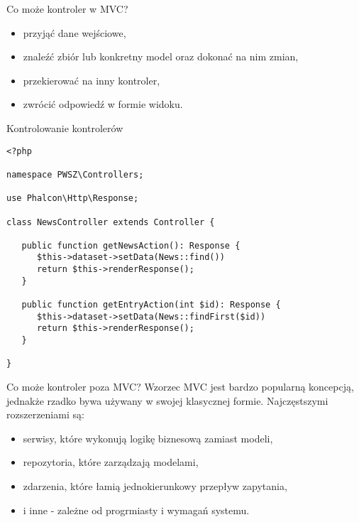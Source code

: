 \begin{frame}{Co może kontroler w MVC?}
	\begin{itemize}
		\item przyjąć dane wejściowe,
		\item znaleźć zbiór lub konkretny model oraz dokonać na nim zmian,
		\item przekierować na inny kontroler,
		\item zwrócić odpowiedź w formie widoku.
	\end{itemize}
\end{frame}

\begin{frame}[fragile]{Kontrolowanie kontrolerów}
	\begin{lstlisting}
<?php

namespace PWSZ\Controllers;

use Phalcon\Http\Response;

class NewsController extends Controller {

   public function getNewsAction(): Response {
      $this->dataset->setData(News::find())
      return $this->renderResponse();
   }

   public function getEntryAction(int $id): Response {
      $this->dataset->setData(News::findFirst($id))
      return $this->renderResponse();
   }

}
	\end{lstlisting}
\end{frame}

\begin{frame}{Co może kontroler poza MVC?}
	Wzorzec MVC jest bardzo popularną koncepcją, jednakże rzadko bywa używany w swojej klasycznej formie. Najczęstszymi rozszerzeniami są:
	\begin{itemize}
		\item serwisy, które wykonują logikę biznesową zamiast modeli,
		\item repozytoria, które zarządzają modelami,
		\item zdarzenia, które łamią jednokierunkowy przepływ zapytania,
		\item i inne - zależne od progrmiasty i wymagań systemu.
	\end{itemize}
\end{frame}


